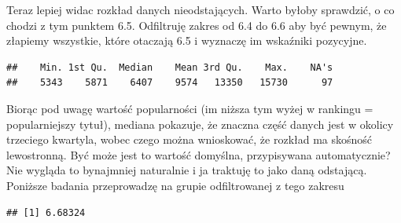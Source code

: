 \documentclass[
]{article}
\newenvironment{Shaded}{\begin{snugshade}}{\end{snugshade}}
\newcommand{\FloatTok}[1]{\textcolor[rgb]{0.00,0.00,0.81}{#1}}
\newcommand{\FunctionTok}[1]{\textcolor[rgb]{0.13,0.29,0.53}{\textbf{#1}}}
\newcommand{\NormalTok}[1]{#1}
\newcommand{\OtherTok}[1]{\textcolor[rgb]{0.56,0.35,0.01}{#1}}
\newcommand{\SpecialCharTok}[1]{\textcolor[rgb]{0.81,0.36,0.00}{\textbf{#1}}}
\begin{document}
Teraz lepiej widac rozkład danych nieodstających. Warto byłoby
sprawdzić, o co chodzi z tym punktem 6.5. Odfiltruję zakres od 6.4 do
6.6 aby być pewnym, że złapiemy wszystkie, które otaczają 6.5 i wyznaczę
im wskaźniki pozycyjne.

\begin{Shaded}
\end{Shaded}

\begin{verbatim}
##    Min. 1st Qu.  Median    Mean 3rd Qu.    Max.    NA's 
##    5343    5871    6407    9574   13350   15730      97
\end{verbatim}

Biorąc pod uwagę wartość popularności (im niższa tym wyżej w rankingu =
popularniejszy tytuł), mediana pokazuje, że znaczna część danych jest w
okolicy trzeciego kwartyla, wobec czego można wnioskować, że rozkład ma
skośność lewostronną. Być może jest to wartość domyślna, przypisywana
automatycznie? Nie wygląda to bynajmniej naturalnie i ja traktuję to
jako daną odstającą. Poniższe badania przeprowadzę na grupie
odfiltrowanej z tego zakresu

\begin{Shaded}
\end{Shaded}

\begin{verbatim}
## [1] 6.68324
\end{verbatim}

\begin{Shaded}
\end{Shaded}
\end{document}
